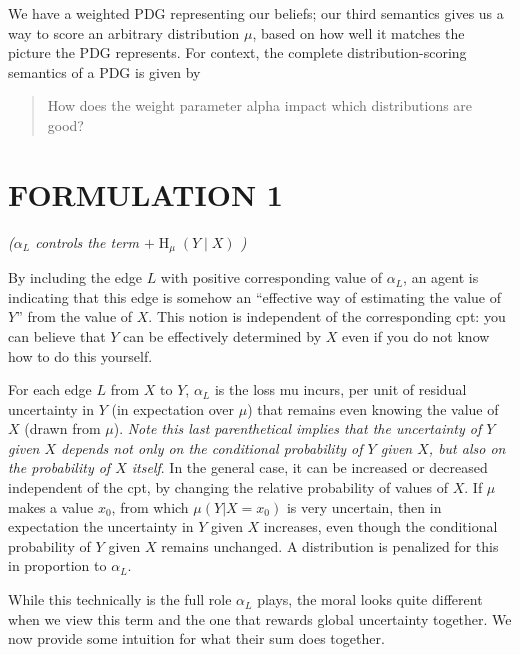 \documentclass{article}
\renewcommand{\H}{\mathop{\mathrm H}}
\begin{document}
We have a weighted PDG representing our beliefs; 
our third semantics gives us a way to score an arbitrary distribution $\mu$,
based on how well it matches the picture the PDG represents.  For context, the complete distribution-scoring semantics of a PDG is given by

\begin{quote}
How does the weight parameter alpha impact which distributions are good?
\end{quote}

\section*{FORMULATION 1}
\hspace{1in}\textit{($\alpha_L$ controls the term $+\H_\mu(Y \mid X)$ )}

By including the edge $L$ with positive corresponding value of $\alpha_L$, 
an agent is indicating that this edge is somehow an ``effective way of estimating the value of $Y$'' from the value of $X$. This notion is independent of the corresponding cpt: you can believe that $Y$ can be effectively determined by $X$ even if you do not know how to do this yourself.

For each edge $L$ from $X$ to $Y$, $\alpha_L$ is the loss mu incurs, per unit of residual uncertainty in $Y$ (in expectation over $\mu$) that remains even knowing the value of $X$ (drawn from $\mu$). \textit{Note this last parenthetical implies that the uncertainty of $Y$ given $X$ depends not only on the conditional probability of $Y$ given $X$, but also on the probability of $X$ itself}. In the general case, it can be increased or decreased independent of the cpt, by changing the relative probability of values of $X$. If $\mu$ makes a value $x_0$, from which $\mu(Y | X = x_0)$ is very uncertain, then in expectation the uncertainty in $Y$ given $X$ increases, even though the conditional probability of $Y$ given $X$ remains unchanged. A distribution is penalized for this in proportion to $\alpha_L$. 

While this technically is the full role $\alpha_L$ plays, the moral looks quite different when we view this term and the one that rewards global uncertainty together. We now provide some intuition for what their sum does together.
\end{document}
